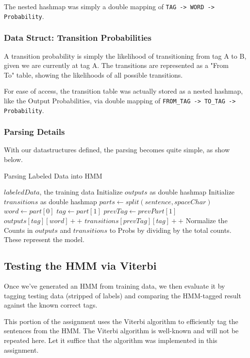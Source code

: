 \documentclass[11pt]{article}
\begin{document}
The nested hashmap was simply a double mapping of \texttt{TAG -> WORD -> Probability}.

\subsubsection{Data Struct: Transition Probabilities}
A transition probability is simply the likelihood of transitioning from tag A to B, given
we are currently at tag A.  The transitions are represented as a "From\\To"
table, showing the likelihoods of all possible transitions.

For ease of access, the transition table was actually stored as a nested hashmap, like the Output
Probabilities, via double mapping of \texttt{FROM\_TAG -> TO\_TAG -> Probability}.

\subsubsection{Parsing Details}
With our datastructures defined, the parsing becomes quite simple, as show below.

\begin{algorithm}
\caption{Parsing Labeled Data into HMM}\label{alg:parse}
\begin{algorithmic}[1]
\Require $labeledData$, the training data
\State Initialize $outputs$ as double hashmap
\State Initialize $transitions$ as double hashmap
\State $parts \gets split(sentence, spaceChar)$
\State $word \gets part[0] $
\State $tag \gets part[1] $
\State $prevTag \gets prevPart[1] $
\State $outputs[tag][word]++ $
\State $transitions[prevTag][tag]++ $
\EndFor
\EndFor
\State Normalize the Counts in $outputs$ and $transitions$ to Probs by dividing by the total counts. These represent the model.
\end{algorithmic}
\end{algorithm}


\subsection{Testing the HMM via Viterbi}
Once we've generated an HMM from training data, we then evaluate it by
tagging testing data (stripped of labels) and comparing the HMM-tagged
result against the known correct tags.

This portion of the assignment uses the Viterbi algorithm to efficiently
tag the sentences from the HMM.  The Viterbi algorithm is well-known and
will not be repeated here.  Let it suffice that the algorithm was implemented
in this assignment.
\end{document}
